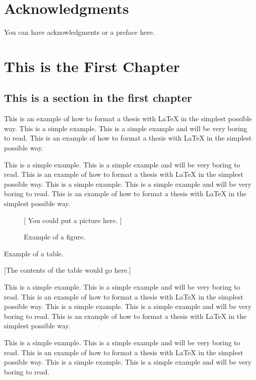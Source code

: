 \documentclass[12pt]{report}
\begin{document}
\chapter*{Acknowledgments}
You can have acknowledgments or a preface here.

\tableofcontents
\listoffigures  %
\listoftables %

\chapter{This is the First Chapter}

\section{This is a section in the first chapter}

This is an example of how to format a thesis with LaTeX in the simplest possible way.
This is a simple example.  This is a simple example and will be very boring to read.
This is an example of how to format a thesis with LaTeX in the simplest possible way.

This is a simple example.  This is a simple example and will be very boring to read.
This is an example of how to format a thesis with LaTeX in the simplest possible way.
This is a simple example.  This is a simple example and will be very boring to read.
This is an example of how to format a thesis with LaTeX in the simplest possible way.

\begin{figure}
\centerline{[ You could put a picture here. ]}
\caption{Example of a figure.}
\end{figure}

\begin{table}
\caption{Example of a table.}
\centerline{[The contents of the table would go here.]}
\end{table}

This is a simple example.  This is a simple example and will be very boring to read.
This is an example of how to format a thesis with LaTeX in the simplest possible way.
This is a simple example.  This is a simple example and will be very boring to read.
This is an example of how to format a thesis with LaTeX in the simplest possible way.

This is a simple example.  This is a simple example and will be very boring to read.
This is an example of how to format a thesis with LaTeX in the simplest possible way.
This is a simple example.  This is a simple example and will be very boring to read.
\end{document}
